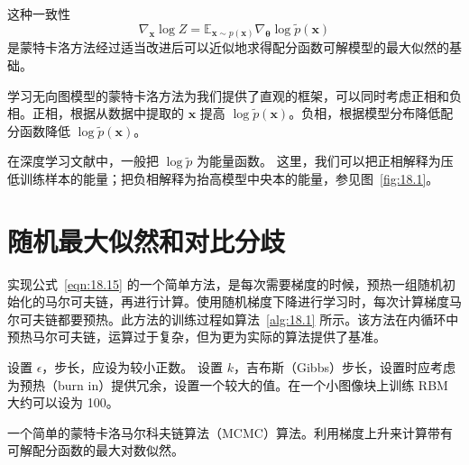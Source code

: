 这种一致性
\begin{equation}\label{eqn:18.15}
    \nabla_{\bm{x}}\log{}Z
    = \mathbb{E}_{\bm{x}\sim{}p(\bm{x})}
    \nabla_{\bm{\theta}}\log\widetilde{p}(\bm{x})
\end{equation}
是蒙特卡洛方法经过适当改进后可以近似地求得配分函数可解模型的最大似然的基础。

学习无向图模型的蒙特卡洛方法为我们提供了直观的框架，可以同时考虑正相和负相。正相，根据从数据中提取的 \(\bm x\) 提高 \(\log\widetilde{p}(\bm x)\)。负相，根据模型分布降低配分函数降低 \(\log\widetilde{p}(\bm x)\)。

在深度学习文献中，一般把 \(\log\widetilde{p}\) 为能量函数。
这里，我们可以把正相解释为压低训练样本的能量；把负相解释为抬高模型中央本的能量，参见图~\ref{fig:18.1}。

\section{随机最大似然和对比分歧}
\label{sec:18.2}

实现公式~\ref{eqn:18.15} 的一个简单方法，是每次需要梯度的时候，预热一组随机初始化的马尔可夫链，再进行计算。使用随机梯度下降进行学习时，每次计算梯度马尔可夫链都要预热。此方法的训练过程如算法~\ref{alg:18.1} 所示。该方法在内循环中预热马尔可夫链，运算过于复杂，但为更为实际的算法提供了基准。

\begin{algorithm}
\DontPrintSemicolon
设置 \(\epsilon\)，步长，应设为较小正数。\;
设置 \(k\)，吉布斯（Gibbs）步长，设置时应考虑为预热（burn in）提供冗余，设置一个较大的值。在一个小图像块上训练 RBM 大约可以设为 100。\;
\caption{一个简单的蒙特卡洛马尔科夫链算法（MCMC）算法。利用梯度上升来计算带有可解配分函数的最大对数似然。\label{alg:18.1}}
\end{algorithm}


